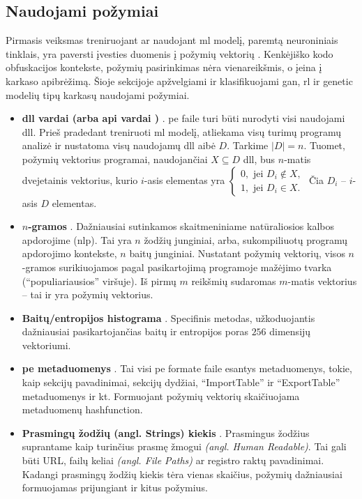 \subsection{Naudojami požymiai}\label{sec:literature:features}
\color{red}
Pirmasis veiksmas treniruojant ar naudojant \ac{ml} modelį, paremtą neuroniniais tinklais, yra paversti įvesties duomenis į požymių vektorių \citeplace. Kenkėjiško kodo obfuskacijos kontekste, požymių pasirinkimas nėra vienareikšmis, o įeina į karkaso apibrėžimą. Šioje sekcijoje apžvelgiami ir klasifikuojami \acs{gan}, \acs{rl} ir \acs{genetic} modelių tipų karkasų naudojami požymiai.
\color{black}
\begin{itemize}
    \item \textbf{\acs{dll} vardai (arba \acs{api} vardai \cite{huGeneratingAdversarialMalware2017})} \cite{zhongMalFoxCamouflagedAdversarial2024}. \acs{pe} faile turi būti nurodyti visi naudojami \acs{dll}. Prieš pradedant treniruoti \acs{ml} modelį, atliekama visų turimų programų analizė ir nustatoma visų naudojamų \acs{dll} aibė $D$. Tarkime $|D| = n$. Tuomet, požymių vektorius programai, naudojančiai $X \subseteq D$ \acs{dll}, bus $n$-matis dvejetainis vektorius, kurio $i$-asis elementas yra $\begin{cases}
        0, \text{ jei } D_i \not \in X,\\
        1, \text{ jei } D_i \in X.
    \end{cases}$ Čia $D_i$ -- $i$-asis $D$ elementas.
    \item \textbf{$n$-gramos} \cite{zhuNgramMalGANEvading2022}. Dažniausiai sutinkamos skaitmeniniame natūraliosios kalbos apdorojime (\acs{nlp}). Tai yra $n$ žodžių junginiai, arba, sukompiliuotų programų apdorojimo kontekste, $n$ baitų junginiai. Nustatant požymių vektorių, visos $n$-gramos surikiuojamos pagal pasikartojimą programoje mažėjimo tvarka (\enquote{populiariausios} viršuje). Iš pirmų $m$ reikšmių sudaromas $m$-matis vektorius -- tai ir yra požymių vektorius.
    \item \textbf{Baitų/entropijos histograma} \cite{saxeDeepNeuralNetwork2015}. Specifinis metodas, užkoduojantis dažniausiai pasikartojančias baitų ir entropijos poras $256$ dimensijų vektoriumi.
    \item \textbf{\acs{pe} metaduomenys} \cite{andersonLearningEvadeStatic2018}. Tai visi \acs{pe} formate faile esantys metaduomenys, tokie, kaip sekcijų pavadinimai, sekcijų dydžiai, \enquote{ImportTable} ir \enquote{ExportTable} metaduomenys ir kt. Formuojant požymių vektorių skaičiuojama metaduomenų \gls{hashfunction}.
    \item \textbf{Prasmingų žodžių (angl. Strings) kiekis} \cite{andersonLearningEvadeStatic2018}. Prasmingus žodžius suprantame kaip turinčius prasmę žmogui \textit{(angl. Human Readable)}. Tai gali būti URL, failų keliai \textit{(angl. File Paths)} ar registro raktų pavadinimai. Kadangi prasmingų žodžių kiekis tėra vienas skaičius, požymių dažniausiai formuojamas prijungiant ir kitus požymius.
\end{itemize}